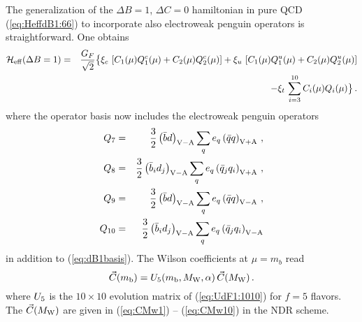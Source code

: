 The generalization of the $\Delta B=1$, $\Delta C=0$ hamiltonian in pure
QCD (\ref{eq:HeffdB1:66}) to incorporate also electroweak penguin
operators is straightforward. One obtains
\begin{eqnarray} 
{\cal H}_{\rm eff}(\Delta B=1) &=& \frac{G_F}{\sqrt{2}} \bigl\{
   \xi_c \, \left[ C_1(\mu) Q_1^c(\mu) + C_2(\mu) Q_2^c(\mu) \right] +
   \xi_u \, \left[ C_1(\mu) Q_1^u(\mu) + C_2(\mu) Q_2^u(\mu) \right] 
\nonumber \\
 & & - \xi_t \, \sum_{i=3}^{10} C_i(\mu) Q_i(\mu)
\bigr\} \, .
\label{eq:HeffdB1:1010}
\end{eqnarray} 
where the operator basis now includes the electroweak penguin
operators
\begin{eqnarray}
Q_{7} & = & \frac{3}{2} \left( \bar b d \right)_{\rm V-A}
         \sum_{q} e_{q} \left( \bar q q \right)_{\rm V+A}
\, , \nonumber \\
Q_{8} & = & \frac{3}{2} \left( \bar b_{i} d_{j} \right)_{\rm V-A}
         \sum_{q} e_{q} \left( \bar q_{j}  q_{i}\right)_{\rm V+A}
\, , \nonumber \\
Q_{9} & = & \frac{3}{2} \left( \bar b d \right)_{\rm V-A}
         \sum_{q} e_{q} \left( \bar q q \right)_{\rm V-A}
\, , \label{eq:dB1:1010basis} \\
Q_{10}& = & \frac{3}{2} \left( \bar b_{i} d_{j} \right)_{\rm V-A}
         \sum_{q} e_{q} \left( \bar q_{j}  q_{i}\right)_{\rm V-A}
\nonumber
\end{eqnarray}
in addition to (\ref{eq:dB1basis}). The Wilson coefficients at $\mu=m_b$
read
\begin{equation}
\vec{C}(m_{\rm b}) = U_5(m_{\rm b},M_{\rm W},\alpha) \, \vec{C}(M_{\rm W}) \, .
\label{eq:HeffdB1:1010:wc}
\end{equation}
where $U_5$ is the $10\times 10$ evolution matrix of
(\ref{eq:UdF1:1010}) for $f=5$ flavors. The $\vec{C}(M_{\rm W})$ are given in
(\ref{eq:CMw1}) -- (\ref{eq:CMw10}) in the NDR scheme.

